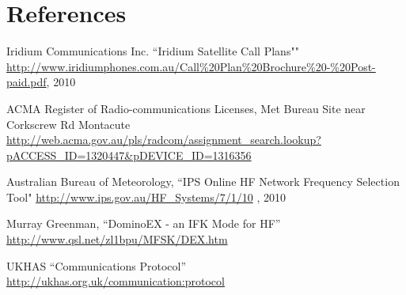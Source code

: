 \documentclass[a4paper,12pt]{article}
\begin{document}
\section{References}
\renewcommand*{\refname}{\vspace*{-12mm}}
\begin{thebibliography}{99}
Iridium Communications Inc. ``Iridium Satellite Call Plans"" \url{http://www.iridiumphones.com.au/Call\%20Plan\%20Brochure\%20-\%20Post-paid.pdf}, 2010

ACMA Register of Radio-communications Licenses, Met Bureau Site near Corkscrew Rd Montacute \url{http://web.acma.gov.au/pls/radcom/assignment\_search.lookup?pACCESS\_ID=1320447&pDEVICE\_ID=1316356}

Australian Bureau of Meteorology, ``IPS Online HF Network Frequency Selection Tool" \url{http://www.ips.gov.au/HF\_Systems/7/1/10} , 2010 %

Murray Greenman, ``DominoEX - an IFK Mode for HF'' 
\url{http://www.qsl.net/zl1bpu/MFSK/DEX.htm}

UKHAS ``Communications Protocol''
\url{http://ukhas.org.uk/communication:protocol}

\end{thebibliography}
\end{document}
